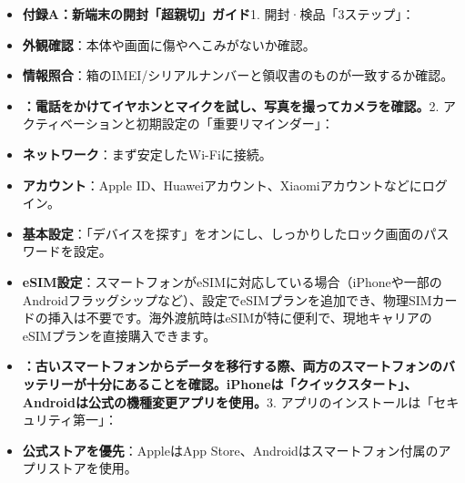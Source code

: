 

\begin{itemize}
  \item \textbf{付録A：新端末の開封「超親切」ガイド}1. 開封·検品「3ステップ」：
  \item \textbf{外観確認}：本体や画面に傷やへこみがないか確認。
  \item \textbf{情報照合}：箱のIMEI/シリアルナンバーと領収書のものが一致するか確認。
\end{itemize}


\begin{itemize}
  \item \textbf{：電話をかけてイヤホンとマイクを試し、写真を撮ってカメラを確認。}2. アクティベーションと初期設定の「重要リマインダー」：
  \item \textbf{ネットワーク}：まず安定したWi-Fiに接続。
  \item \textbf{アカウント}：Apple ID、Huaweiアカウント、Xiaomiアカウントなどにログイン。
  \item \textbf{基本設定}：「デバイスを探す」をオンにし、しっかりしたロック画面のパスワードを設定。
  \item \textbf{eSIM設定}：スマートフォンがeSIMに対応している場合（iPhoneや一部のAndroidフラッグシップなど）、設定でeSIMプランを追加でき、物理SIMカードの挿入は不要です。海外渡航時はeSIMが特に便利で、現地キャリアのeSIMプランを直接購入できます。
\end{itemize}


\begin{itemize}
  \item \textbf{：古いスマートフォンからデータを移行する際、両方のスマートフォンのバッテリーが十分にあることを確認。iPhoneは「クイックスタート」、Androidは公式の機種変更アプリを使用。}3. アプリのインストールは「セキュリティ第一」：
  \item \textbf{公式ストアを優先}：AppleはApp Store、Androidはスマートフォン付属のアプリストアを使用。
\end{itemize}
